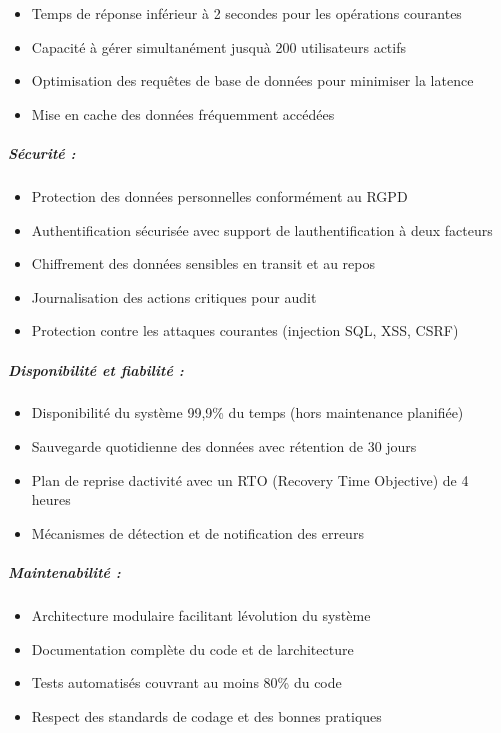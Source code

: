 \documentclass[12pt,a4paper,twoside]{report}
\begin{document}
\begin{itemize}
\item
  Temps de réponse inférieur à 2 secondes pour les opérations courantes
\item
  Capacité à gérer simultanément jusqu\textquotesingle à 200
  utilisateurs actifs
\item
  Optimisation des requêtes de base de données pour minimiser la latence
\item
  Mise en cache des données fréquemment accédées
\end{itemize}

\hypertarget{suxe9curituxe9}{%
\subparagraph{Sécurité :}\label{suxe9curituxe9}}

\begin{itemize}
\item
  Protection des données personnelles conformément au RGPD
\item
  Authentification sécurisée avec support de
  l\textquotesingle authentification à deux facteurs
\item
  Chiffrement des données sensibles en transit et au repos
\item
  Journalisation des actions critiques pour audit
\item
  Protection contre les attaques courantes (injection SQL, XSS, CSRF)
\end{itemize}

\hypertarget{disponibilituxe9-et-fiabilituxe9}{%
\subparagraph{Disponibilité et fiabilité
:}\label{disponibilituxe9-et-fiabilituxe9}}

\begin{itemize}
\item
  Disponibilité du système 99,9\% du temps (hors maintenance planifiée)
\item
  Sauvegarde quotidienne des données avec rétention de 30 jours
\item
  Plan de reprise d\textquotesingle activité avec un RTO (Recovery Time
  Objective) de 4 heures
\item
  Mécanismes de détection et de notification des erreurs
\end{itemize}

\hypertarget{maintenabilituxe9}{%
\subparagraph{Maintenabilité :}\label{maintenabilituxe9}}

\begin{itemize}
\item
  Architecture modulaire facilitant l\textquotesingle évolution du
  système
\item
  Documentation complète du code et de l\textquotesingle architecture
\item
  Tests automatisés couvrant au moins 80\% du code
\item
  Respect des standards de codage et des bonnes pratiques
\end{itemize}
\end{document}
